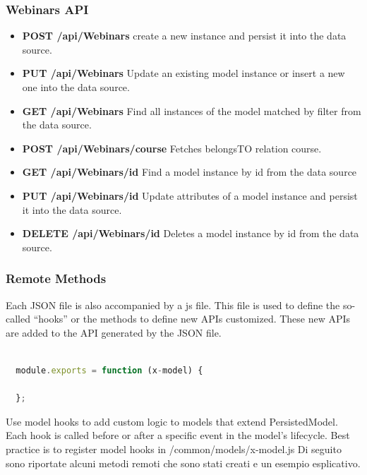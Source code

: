 \subsubsection{Webinars API}
\begin{itemize}
\item \textbf{POST /api/Webinars} create a new instance and persist it into the data source.
\item \textbf{PUT /api/Webinars} Update an existing model instance or insert a new one into the data source.
\item \textbf{GET /api/Webinars} Find all instances of the model matched by filter from the  data source.
\item \textbf{POST /api/Webinars/course} Fetches belongsTO relation course.
\item \textbf{GET /api/Webinars/id} Find a model instance by id from the data source
\item \textbf{PUT /api/Webinars/id} Update attributes of a model instance and persist it into the data source.
\item \textbf{DELETE /api/Webinars/id} Deletes a model instance by id from the data 
source.
\end{itemize}

 \subsubsection{ Remote Methods }

Each JSON file is also accompanied by a js file. This file is used to define the so-called “hooks” or the methods to define new APIs customized. These new APIs are added to the API generated by the JSON file.
  

\begin{lstlisting}[language=javascript]

  module.exports = function (x-model) {
  
  };
\end{lstlisting}


Use model hooks to add custom logic to models that extend PersistedModel. Each hook is called before or after a specific event in the model's lifecycle.
Best practice is to register model hooks in /common/models/x-model.js
Di seguito sono riportate alcuni metodi remoti che sono stati creati e un esempio esplicativo.

